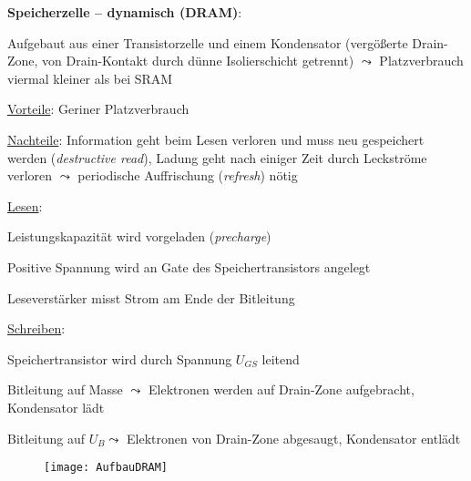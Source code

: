 \textbf{Speicherzelle -- dynamisch (DRAM)}:
\begin{items}
	\item Aufgebaut aus einer Transistorzelle und einem Kondensator (vergößerte Drain-Zone, von Drain-Kontakt durch dünne Isolierschicht getrennt) \( \leadsto \) Platzverbrauch viermal kleiner als bei SRAM
	\item \underline{Vorteile}: Geriner Platzverbrauch
	\item \underline{Nachteile}: Information geht beim Lesen verloren und muss neu gespeichert werden (\emph{destructive read}), Ladung geht nach einiger Zeit durch Leckströme verloren \( \leadsto \) periodische Auffrischung (\emph{refresh}) nötig
	\item \underline{Lesen}:
	\begin{enumeration}
		\item Leistungskapazität wird vorgeladen (\emph{precharge})
		\item Positive Spannung wird an Gate des Speichertransistors angelegt
		\item Leseverstärker misst Strom am Ende der Bitleitung
	\end{enumeration}
	\item \underline{Schreiben}: 
	\begin{enumeration}
		\item Speichertransistor wird durch Spannung \( U_{GS} \) leitend
		\item Bitleitung auf Masse  \( \leadsto \) Elektronen werden auf Drain-Zone aufgebracht, Kondensator lädt
		\item Bitleitung auf \( U_B \leadsto \) Elektronen von Drain-Zone abgesaugt, Kondensator entlädt 
	\end{enumeration}
\end{items}
\begin{figure}[H]\centering\label{AufbauDRAM}\texttt{[image: AufbauDRAM]}\end{figure}